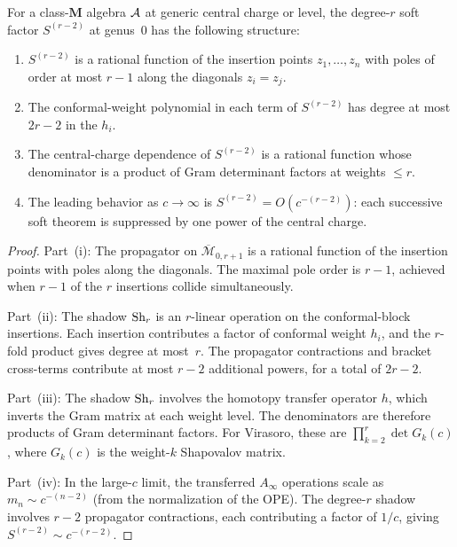\begin{proposition}
\label{prop:thqg-VI-polynomial-growth}
For a class-$\mathbf{M}$ algebra $\mathcal{A}$ at generic central charge
or level, the degree-$r$ soft factor $S^{(r-2)}$ at genus~$0$ has
the following structure:
\begin{enumerate}[label=\textup{(\roman*)}]
\item $S^{(r-2)}$ is a rational function of the insertion
 points $z_1, \dotsc, z_n$ with poles of order at most $r-1$
 along the diagonals $z_i = z_j$.
\item The conformal-weight polynomial in each term of $S^{(r-2)}$
 has degree at most $2r - 2$ in the $h_i$.
\item The central-charge dependence of $S^{(r-2)}$ is a rational
 function whose denominator is a product of Gram determinant
 factors at weights $\leq r$.
\item The leading behavior as $c \to \infty$ is
 $S^{(r-2)} = O(c^{-(r-2)})$: each successive soft theorem is
 suppressed by one power of the central charge.
\end{enumerate}
\end{proposition}

\begin{proof}
Part~(i): The propagator on $\overline{\mathcal{M}}_{0,r+1}$
is a rational function of the insertion points with poles along
the diagonals. The maximal pole order is $r-1$, achieved when
$r-1$ of the $r$ insertions collide simultaneously.

Part~(ii): The shadow $\operatorname{Sh}_r$ is an $r$-linear operation on the
conformal-block insertions. Each insertion contributes a factor
of conformal weight $h_i$, and the $r$-fold product gives
degree at most~$r$. The propagator contractions and bracket
cross-terms contribute at most $r - 2$ additional powers, for
a total of $2r - 2$.

Part~(iii): The shadow $\operatorname{Sh}_r$ involves the homotopy transfer
operator $h$, which inverts the Gram matrix at each weight
level. The denominators are therefore products of Gram
determinant factors. For Virasoro, these are
$\prod_{k=2}^{r} \det G_k(c)$, where $G_k(c)$ is the
weight-$k$ Shapovalov matrix.

Part~(iv): In the large-$c$ limit, the transferred
$A_\infty$ operations scale as $m_n \sim c^{-(n-2)}$ (from
the normalization of the OPE). The degree-$r$ shadow involves
$r-2$ propagator contractions, each contributing a factor of
$1/c$, giving $S^{(r-2)} \sim c^{-(r-2)}$.
\end{proof}


